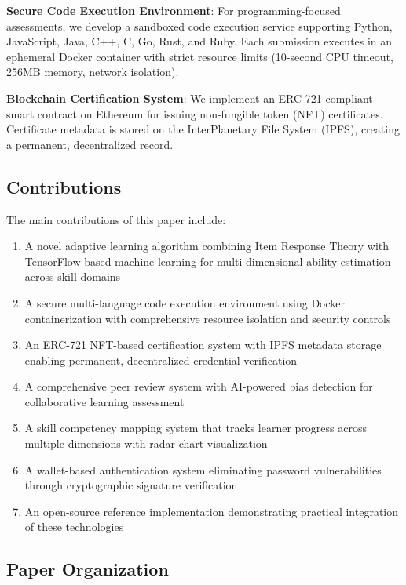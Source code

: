 \documentclass[conference]{IEEEtran}
\begin{document}
\textbf{Secure Code Execution Environment}: For programming-focused assessments, we develop a sandboxed code execution service supporting Python, JavaScript, Java, C++, C, Go, Rust, and Ruby. Each submission executes in an ephemeral Docker container with strict resource limits (10-second CPU timeout, 256MB memory, network isolation).

\textbf{Blockchain Certification System}: We implement an ERC-721 compliant smart contract on Ethereum for issuing non-fungible token (NFT) certificates. Certificate metadata is stored on the InterPlanetary File System (IPFS), creating a permanent, decentralized record.

\subsection{Contributions}

The main contributions of this paper include:

\begin{enumerate}
    \item A novel adaptive learning algorithm combining Item Response Theory with TensorFlow-based machine learning for multi-dimensional ability estimation across skill domains
    \item A secure multi-language code execution environment using Docker containerization with comprehensive resource isolation and security controls
    \item An ERC-721 NFT-based certification system with IPFS metadata storage enabling permanent, decentralized credential verification
    \item A comprehensive peer review system with AI-powered bias detection for collaborative learning assessment
    \item A skill competency mapping system that tracks learner progress across multiple dimensions with radar chart visualization
    \item A wallet-based authentication system eliminating password vulnerabilities through cryptographic signature verification
    \item An open-source reference implementation demonstrating practical integration of these technologies
\end{enumerate}

\subsection{Paper Organization}
\end{document}
